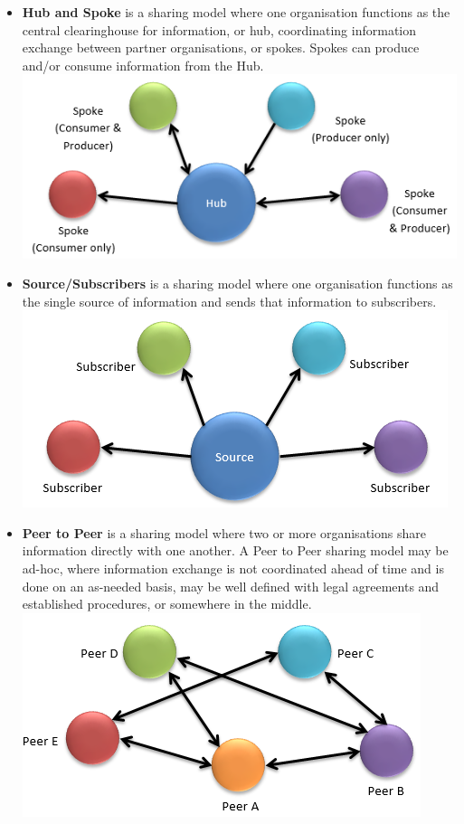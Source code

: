 \documentclass{eplmastersthesis}
\begin{document}
\begin{itemize}
\item \textbf{Hub and Spoke}  is a sharing model where one organisation functions as the central clearinghouse for information, or hub, coordinating information exchange between partner organisations, or spokes. Spokes can produce and/or consume information from the Hub.\\
\centering
\includegraphics[scale=0.5]{res/hub-and-spoke}
\item \textbf{Source/Subscribers} is a sharing model where one organisation functions as the single source of information and sends that information to subscribers.\\
\centering
\includegraphics[scale=0.5]{res/source-subscriber}
\item \textbf{Peer to Peer}  is a sharing model where two or more organisations share information directly with one another. A Peer to Peer sharing model may be ad-hoc, where information exchange is not coordinated ahead of time and is done on an as-needed basis, may be well defined with legal agreements and established procedures, or somewhere in the middle.\\
\centering
\includegraphics[scale=0.5]{res/peer-to-peer}
\end{itemize}
\end{document}
